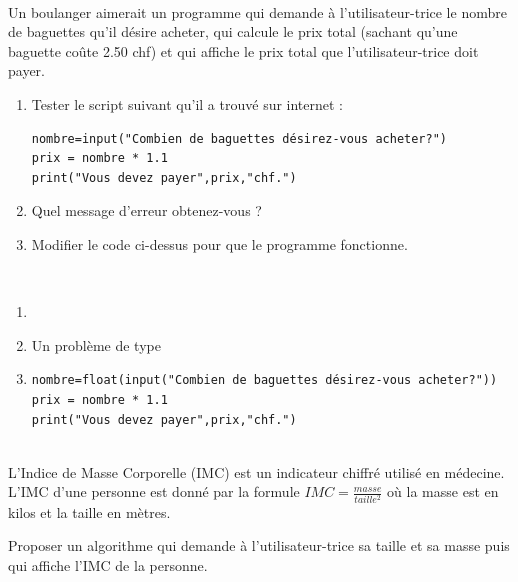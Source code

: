 \documentclass[a4paper,12pt]{article}
\newcommand{\numero}{2}                                    %
\begin{document}
\exo{}  ~\\ 
  Un boulanger aimerait un programme qui demande à l'utilisateur-trice le nombre de baguettes qu'il désire acheter, qui calcule le prix total (sachant qu'une baguette coûte 2.50 chf) et qui affiche le prix total que l'utilisateur-trice doit payer.
\begin{enumerate}[label=\alph*)]
	\item Tester le script suivant qu'il a trouvé sur internet :
	\begin{lstlisting}[numbers=none]
nombre=input("Combien de baguettes désirez-vous acheter?")
prix = nombre * 1.1
print("Vous devez payer",prix,"chf.")
	\end{lstlisting}
	\item Quel message d'erreur obtenez-vous ?
	
	\item Modifier le code ci-dessus pour que le programme fonctionne.
\end{enumerate}
\begin{correction}
	~\\ 
	\begin{enumerate}[label=\alph*)]
		\item  	\ 

		\item Un problème de type
		
		\item 
		\begin{lstlisting}[numbers=none]
nombre=float(input("Combien de baguettes désirez-vous acheter?"))
prix = nombre * 1.1
print("Vous devez payer",prix,"chf.")
		\end{lstlisting}
	\end{enumerate}
\end{correction}
\finexo

\exo{}  ~\\ 
  L'Indice de Masse Corporelle (IMC) est un indicateur chiffré utilisé en médecine. L'IMC d'une personne est donné par la formule $IMC = \frac{masse}{taille ^2}$  où la masse est en kilos et la taille en mètres. 

Proposer un algorithme qui demande à l'utilisateur-trice sa taille et sa masse puis qui affiche l'IMC de la personne. 
\begin{correction}
	~\\ 
	
\end{correction}
\finexo

		\newpage
		\setcounter{page}{1}
		\setcounter{section}{\numero}
		

		\section{}
	
\end{document}
